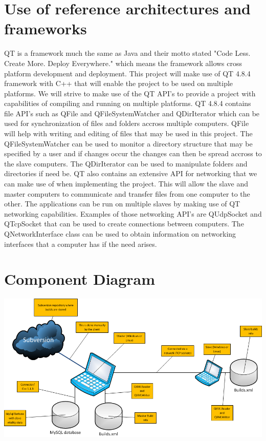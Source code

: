 \documentclass[a4paper,12pt,final]{article}
\begin{document}
\section{Use of reference architectures and\\ frameworks}
QT is a framework much the same as Java and their motto stated "Code Less. Create More. Deploy Everywhere." which means the framework allows cross platform development and deployment. This project will make use of QT 4.8.4 framework with C++ that will enable the project to be used on multiple platforms. We will strive to make use of the QT API's to provide a project with capabilities of compiling and running on multiple platforms.
\vspace{6pt}\newline
QT 4.8.4 contains file API's such as QFile and QFileSystemWatcher and QDirIterator which can be used for synchronization of files and folders accross multiple computers. QFile will help with writing and editing of files that may be used in this project. The QFileSystemWatcher can be used to monitor a directory structure that may be specified by a user and if changes occur the changes can then be spread accross to the slave computers. The QDirIterator can be used to manipulate folders and directories if need be.
\vspace{6pt}\newline
QT also contains an extensive API for networking that we can make use of when implementing the project. This will allow the slave and master computers to communicate and transfer files from one computer to the other. The applications can be run on multiple slaves by making use of QT networking capabilities. Examples of those networking API's are QUdpSocket and QTcpSocket that can be used to create connections between computers. The QNetworkInterface class can be used to obtain information on networking interfaces that a computer has if the need arises.

\section{Component Diagram}
\begin{center}
\includegraphics[scale=0.55]{ComponentDiag.png}
\end{center}
\end{document}
